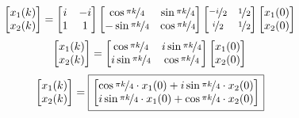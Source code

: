 \documentclass[a3paper,14pt]{extarticle}
\newcommand*\squared[1]{\tikz[baseline=(char.base)]{
            \node[shape=rectangle,draw,inner sep=4pt] (char) {$#1$};}}
\begin{document}
$$\begin{bmatrix}
    x_1(k) \\ x_2(k)
\end{bmatrix} = \begin{bmatrix}
    i & -i \\ 1 & 1 
\end{bmatrix}\begin{bmatrix}
    \cos{\nicefrac{\pi k}{4}} & \sin{\nicefrac{\pi k}{4}} \\ -\sin{\nicefrac{\pi k}{4}} & \cos{\nicefrac{\pi k}{4}}
\end{bmatrix}\begin{bmatrix}
    \nicefrac{-i}{2} & \nicefrac{1}{2} \\ \nicefrac{i}{2} & \nicefrac{1}{2}
\end{bmatrix}\begin{bmatrix}
    x_1(0) \\ x_2(0)
\end{bmatrix}$$
$$\begin{bmatrix}
    x_1(k) \\ x_2(k)
\end{bmatrix} =\begin{bmatrix}
    \cos{\nicefrac{\pi k}{4}} & i\sin{\nicefrac{\pi k}{4}} \\ i\sin{\nicefrac{\pi k}{4}} & \cos{\nicefrac{\pi k}{4}}
\end{bmatrix}\begin{bmatrix}
    x_1(0) \\ x_2(0)
\end{bmatrix}$$
$$\begin{bmatrix}
    x_1(k) \\ x_2(k)
\end{bmatrix} = \squared{\begin{bmatrix}
    \cos{\nicefrac{\pi k}{4}}\cdot x_1(0)+i\sin{\nicefrac{\pi k}{4}}\cdot x_2(0) \\ i\sin{\nicefrac{\pi k}{4}}\cdot x_1(0) + \cos{\nicefrac{\pi k}{4}}\cdot x_2(0)
\end{bmatrix}}$$
\end{document}
